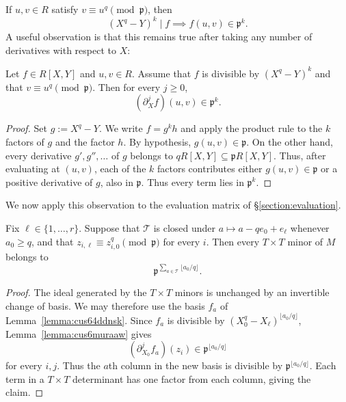 \documentclass[reqno]{amsart} 
\begin{document}
If $u, v \in R$ satisfy $v \equiv u^q \pmod{\mathfrak{p}}$, then
\begin{equation*}
  (X^q - Y)^k \mid f \implies f(u,v) \in \mathfrak{p}^k.
\end{equation*}
A useful observation \cite[\S5]{hexagon:2610.00311v2} is that this remains true after taking any number of derivatives with respect to $X$:
\begin{lemma}\label{lemma:cus6muraaw}
  Let $f \in R[X,Y]$ and $u, v \in R$.  Assume that $f$ is divisible by $(X^q - Y)^k$ and that $v \equiv u^q \pmod{\mathfrak{p}}$.  Then for every $j \geq 0$,
  \begin{equation*}
    (\partial_X^j f)(u,v) \in \mathfrak{p}^k.
  \end{equation*}
\end{lemma}
\begin{proof}
  Set $g := X^q - Y$.  We write $f = g^k h$ and apply the product rule to the $k$ factors of $g$ and the factor $h$.  By hypothesis, $g(u, v) \in \mathfrak{p}$.  On the other hand, every derivative $g', g'', \dotsc$ of $g$ belongs to $qR[X,Y] \subseteq \mathfrak{p}R[X,Y]$.  Thus, after evaluating at $(u, v)$, each of the $k$ factors contributes either $g(u,v) \in \mathfrak{p}$ or a positive derivative of $g$, also in $\mathfrak{p}$.  Thus every term lies in $\mathfrak{p}^k$.
\end{proof}

We now apply this observation to the evaluation matrix of \S\ref{section:evaluation}.
\begin{lemma}\label{lemma:determinantal-divisibility}
  Fix $\ell \in \{1, \dotsc, r\}$.  Suppose that $\mathcal{T}$ is closed under $a \mapsto a - qe_0 + e_\ell$ whenever $a_0 \geq q$, and that $z_{i,\ell} \equiv z_{i,0}^q \pmod{\mathfrak{p}}$ for every $i$.  Then every $T \times T$ minor of $M$ belongs to
  \begin{equation*}
    \mathfrak{p}^{\sum_{a \in \mathcal{T}}\lfloor a_0/q\rfloor}.
  \end{equation*}
\end{lemma}
\begin{proof}
  The ideal generated by the $T \times T$ minors is unchanged by an invertible change of basis.  We may therefore use the basis $f_a$ of Lemma~\ref{lemma:cus64ddnsk}.  Since $f_a$ is divisible by $(X_0^q-X_\ell)^{\lfloor a_0/q\rfloor}$, Lemma~\ref{lemma:cus6muraaw} gives
  \begin{equation*}
    (\partial_{X_0}^j f_a)(z_i) \in \mathfrak{p}^{\lfloor a_0/q\rfloor}
  \end{equation*}
  for every $i,j$.  Thus the $a$th column in the new basis is divisible by $\mathfrak{p}^{\lfloor a_0/q\rfloor}$.  Each term in a $T \times T$ determinant has one factor from each column, giving the claim.
\end{proof}
\end{document}
